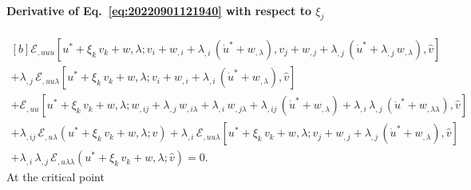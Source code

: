 \documentclass[12pt, final]{scrartcl}
\theoremstyle{definition}
\newcommand{\E}{\mathcal E}
\begin{document}
\paragraph{Derivative of Eq.~\eqref{eq:20220901121940} with respect to \(\xi_j\)}
\begin{equation}
  \label{eq:20220901125230}
  \begin{gathered}[b]
    \E_{,uuu}[u^\ast + \xi_k \, v_k + w, \lambda; v_i + w_{,i} + \lambda_{,i} \, ( \dot{u}^\ast + w_{,\lambda} ), v_j + w_{,j} + \lambda_{,j} \, ( \dot{u}^\ast + \lambda_{,j} \, w_{,\lambda} ), \hat{v}]\\
    + \lambda_{,j} \, \E_{,uu\lambda}[u^\ast + \xi_k \, v_k + w, \lambda; v_i + w_{,i} + \lambda_{,i} \, ( \dot{u}^\ast + w_{,\lambda} ), \hat{v}]\\
    + \E_{,uu}[u^\ast + \xi_k \, v_k + w, \lambda; w_{,ij} + \lambda_{, j} \, w_{,i\lambda} + \lambda_{, i} \, w_{,j\lambda} + \lambda_{,ij} \, ( \dot{u}^\ast + w_{,\lambda} ) + \lambda_{,i}\, \lambda_{,j} \, ( \ddot{u}^\ast + w_{,\lambda\lambda} ), \hat{v}]\\
    + \lambda_{, ij} \, \E_{,u\lambda}(u^\ast + \xi_k \, v_k + w, \lambda; \hat{v}) + \lambda_{, i} \, \E_{,uu\lambda}[u^\ast + \xi_k \, v_k + w, \lambda; v_j + w_{,j} + \lambda_{,j} \, (\dot{u}^\ast + w_{,\lambda}), \hat{v}]\\
    + \lambda_{,i} \, \lambda_{,j} \, \E_{,u\lambda\lambda}(u^\ast + \xi_k \, v_k + w, \lambda; \hat{v})= 0.
  \end{gathered}
\end{equation}
At the critical point
\end{document}
